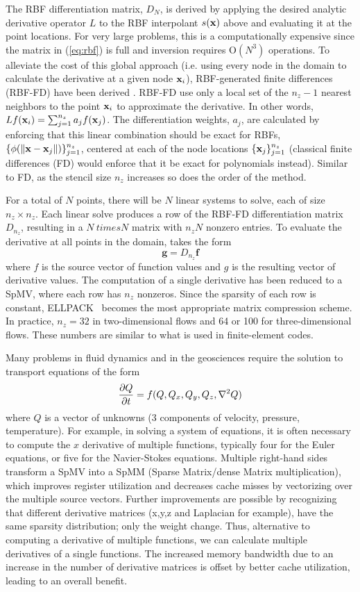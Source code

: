 \documentclass[10pt,conference,compsocconf]{IEEEtran}
\begin{document}
The RBF differentiation matrix, $D_N$, is derived by applying the desired analytic derivative operator $L$ to the RBF interpolant $s({\bf x})$ above and evaluating it at the point locations. For very large problems, this is a computationally expensive since the matrix in (\ref{eq:rbf}) is full and inversion requires O$(N^3)$ operations. To alleviate the cost of this global approach (i.e. using every node in the domain to calculate the derivative at a given node ${\bf x}_i$), RBF-generated finite differences (RBF-FD) have been derived \cite{TAI1,TAI2,SDY02,WrFo06,FoL11,FLBWSC12}. RBF-FD use only a local set of the $n_z-1$ nearest neighbors to the point ${\bf x}_i$ to approximate the derivative. In other words, $Lf({\bf x}_i)=\sum_{j=1}^{n_z}a_jf({\bf x}_j)$. The differentiation weights, $a_j$, are calculated by enforcing that this linear combination should be exact for RBFs, $\{\phi(\|{\bf x}-{\bf x}_{j}\|)\}_{j=1}^{n_z}$, centered at each of the node locations $\{{\bf x}_j\}_{j=1}^{n_z}$ (classical finite differences (FD) would enforce that it be exact for polynomials instead). Similar to FD, as the stencil size $n_z$ increases so does the order of the method.

For a total of $N$ points, there will be $N$ linear systems to solve, each of size $n_z \times n_z$. Each linear solve produces a row of the RBF-FD differentiation matrix $D_{n_z}$, resulting in a $N \ times N$ matrix with $n_zN$ nonzero entries. To evaluate the derivative at all points in the domain, takes the form
$$
  \mathbf{g} = D_{n_z} \mathbf{f}
$$
where $f$ is the source vector of function values and $g$ is the resulting vector of derivative values. The computation of a single derivative has been reduced to a SpMV, where each row has $n_z$ nonzeros. Since the sparsity of each row is constant, ELLPACK~\cite{} becomes the most appropriate matrix compression scheme\cite{}. In practice, $n_z=32$ in two-dimensional flows and 64 or 100 for three-dimensional flows. These numbers are similar to what is used in finite-element codes.

Many problems in fluid dynamics and in the geosciences require the solution to transport equations of the form
$$
{\frac{\partial{Q}}{\partial{t}}} = f(Q,Q_x, Q_y, Q_z, \nabla^2 Q)
$$
where $Q$ is a vector of unknowns (3 components of velocity,
pressure, temperature). For example, in solving a system of equations, it is often necessary to compute the $x$
derivative of multiple functions, typically four for the Euler
equations, or five for the Navier-Stokes equations. Multiple
right-hand sides transform a SpMV into a SpMM (Sparse Matrix/dense
Matrix multiplication), which improves register utilization and
decreases cache misses by vectorizing over the multiple source
vectors. Further improvements are possible by recognizing that
different derivative matrices (x,y,z and Laplacian for example), have
the same sparsity distribution; only the weight change.  Thus,
alternative to computing a derivative of multiple functions, we can
calculate multiple derivatives of a single functions. The increased
memory bandwidth due to an increase in the number of derivative
matrices is offset by better cache utilization, leading to an overall
benefit.
\end{document}
